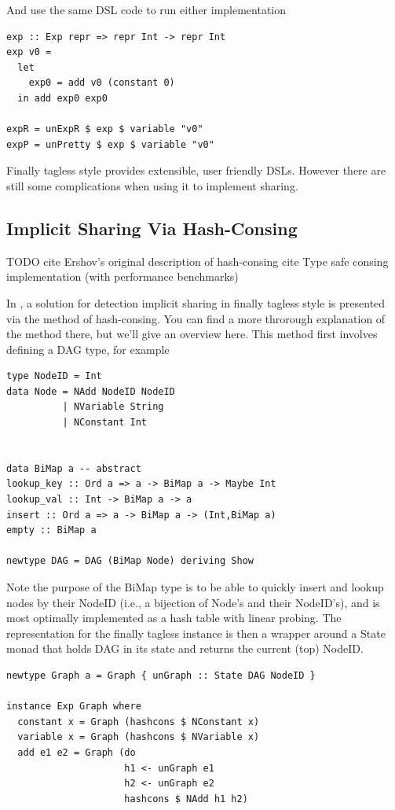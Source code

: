 \documentclass[runningheads]{llncs}
\begin{document}
And use the same DSL code to run either implementation
\begin{verbatim}
exp :: Exp repr => repr Int -> repr Int
exp v0 =
  let
    exp0 = add v0 (constant 0)
  in add exp0 exp0

expR = unExpR $ exp $ variable "v0"
expP = unPretty $ exp $ variable "v0"
\end{verbatim}

Finally tagless style provides extensible, user friendly DSLs. However there
are still some complications when using it to implement sharing.

\subsection{Implicit Sharing Via Hash-Consing}
TODO
cite Ershov’s original description of hash-consing \cite{ershov1958:consing}
cite Type safe consing implementation (with performance benchmarks) \cite{filliatre:typesafeconsing}

In \cite{kiselyov:sharing}, a solution for detection implicit sharing in finally
tagless style is presented via the method of hash-consing. You can find a more
throrough explanation of the method there, but we'll give an overview here. This
method first involves defining a DAG type, for example
\begin{verbatim}
type NodeID = Int
data Node = NAdd NodeID NodeID
          | NVariable String
          | NConstant Int


data BiMap a -- abstract
lookup_key :: Ord a => a -> BiMap a -> Maybe Int
lookup_val :: Int -> BiMap a -> a
insert :: Ord a => a -> BiMap a -> (Int,BiMap a)
empty :: BiMap a

newtype DAG = DAG (BiMap Node) deriving Show
\end{verbatim}

Note the purpose of the BiMap type is to be able to quickly insert and lookup
nodes by their NodeID (i.e., a bijection of Node's and their NodeID's), and is
most optimally implemented as a hash table with linear probing. The
representation for the finally tagless instance is then a wrapper around a State
monad that holds DAG in its state and returns the current (top) NodeID.

\begin{verbatim}
newtype Graph a = Graph { unGraph :: State DAG NodeID }

instance Exp Graph where
  constant x = Graph (hashcons $ NConstant x)
  variable x = Graph (hashcons $ NVariable x)
  add e1 e2 = Graph (do
                     h1 <- unGraph e1
                     h2 <- unGraph e2
                     hashcons $ NAdd h1 h2)
\end{verbatim}
\end{document}
